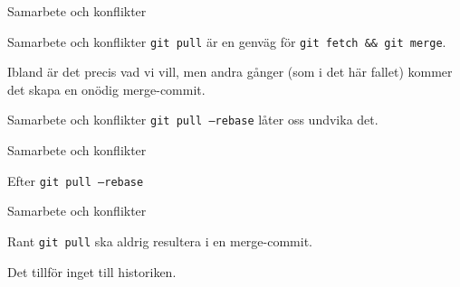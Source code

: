 \documentclass[11pt,xetex]{beamer}
\begin{document}
\begin{frame}{Samarbete och konflikter}
  \captionsetup{type=table}
  \begin{subfigure}[t]{\textwidth}
    \centering
  \end{subfigure}
\end{frame}

\begin{frame}{Samarbete och konflikter}
  \Large
  \texttt{git pull} är en genväg för \texttt{git fetch &&
      git merge}.

  \normalsize
  Ibland är det precis vad vi vill, men andra gånger (som i det här fallet)
  kommer det skapa en onödig merge-commit.
\end{frame}

\begin{frame}{Samarbete och konflikter}
  \Large
  \texttt{git pull --rebase} låter oss undvika det.
\end{frame}

\begin{frame}{Samarbete och konflikter}
  \captionsetup{type=table}
  \begin{subfigure}[t]{\textwidth}
    \centering
  \end{subfigure}

  \center
  Efter \texttt{git pull --rebase}
\end{frame}

\begin{frame}{Samarbete och konflikter}
  \begin{alertblock}{\huge Rant}
    \large
    \texttt{git pull} ska aldrig resultera i en merge-commit.
  \end{alertblock}

  Det tillför inget till historiken.
\end{frame}
\end{document}
